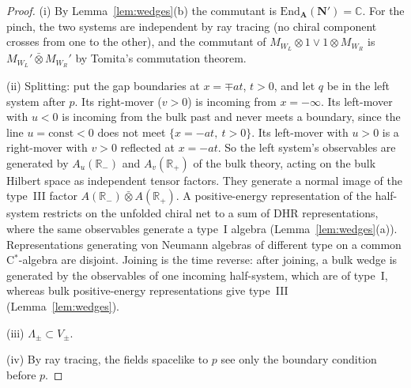 \documentclass[11pt]{article}
\theoremstyle{definition}
\theoremstyle{remark}
\newcommand{\bfA}{\mathbf A}
\begin{document}
\begin{proof}
(i) By Lemma~\ref{lem:wedges}(b) the commutant is $\mathrm{End}_{\bfA}(\mathbf N')=\mathbb C$. For the pinch, the two systems are independent by ray tracing (no chiral component crosses from one to the other), and the commutant of $M_{W_L}\otimes1\vee1\otimes M_{W_R}$ is $M_{W_L}'\bar\otimes M_{W_R}'$ by Tomita's commutation theorem.

(ii) Splitting: put the gap boundaries at $x=\mp at$, $t>0$, and let $q$ be in the left system after $p$. Its right-mover ($v>0$) is incoming from $x=-\infty$. Its left-mover with $u<0$ is incoming from the bulk past and never meets a boundary, since the line $u=\mathrm{const}<0$ does not meet $\{x=-at,\ t>0\}$. Its left-mover with $u>0$ is a right-mover with $v>0$ reflected at $x=-at$. So the left system's observables are generated by $A_u(\mathbb R_-)$ and $A_v(\mathbb R_+)$ of the bulk theory, acting on the bulk Hilbert space as independent tensor factors. They generate a normal image of the type~III factor $A(\mathbb R_-)\bar\otimes A(\mathbb R_+)$. A positive-energy representation of the half-system restricts on the unfolded chiral net to a sum of DHR representations, where the same observables generate a type~I algebra (Lemma~\ref{lem:wedges}(a)). Representations generating von Neumann algebras of different type on a common C$^*$-algebra are disjoint. Joining is the time reverse: after joining, a bulk wedge is generated by the observables of one incoming half-system, which are of type~I, whereas bulk positive-energy representations give type~III (Lemma~\ref{lem:wedges}).

(iii) $\Lambda_\pm\subset V_\pm$.

(iv) By ray tracing, the fields spacelike to $p$ see only the boundary condition before $p$.
\end{proof}
\end{document}
